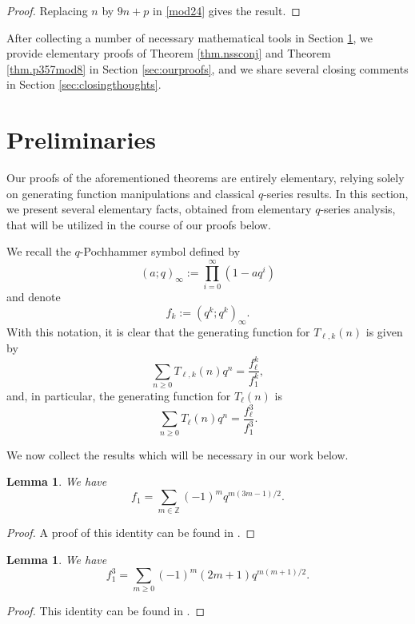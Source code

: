 \documentclass{amsart}
\newtheorem{lemma}[theorem]{Lemma}
\theoremstyle{definition}
\begin{document}
\begin{proof}
Replacing $n$ by $9n+p$ in \eqref{mod24} gives the result.
\end{proof}


After collecting a number of necessary mathematical tools in Section \ref{sec:preliminaries}, we provide elementary proofs of Theorem \ref{thm.nssconj} and Theorem \ref{thm.p357mod8} in Section \ref{sec:ourproofs}, and we share several closing comments in Section \ref{sec:closingthoughts}.

\section{Preliminaries}\label{sec:preliminaries}

Our proofs of the aforementioned theorems are entirely elementary, relying solely on generating function manipulations and classical $q$-series results. In this section, we present several elementary facts, obtained from elementary $q$-series analysis, that will be utilized in the course of our proofs below.

We recall the $q$-Pochhammer symbol defined by
\[
(a;q)_\infty := \prod_{i=0}^{\infty} (1 - aq^i)
\]
and denote
\[
f_k := (q^k;q^k)_\infty.
\]
With this notation, it is clear that the generating function for $T_{\ell,k}(n)$ is given by
\[
\sum_{n \ge 0} T_{\ell,k}(n)q^n = \frac{f_\ell^k}{f_1^k},
\]
and, in particular, the generating function for $T_\ell(n)$ is
\[
\sum_{n \ge 0} T_\ell(n)q^n = \frac{f_\ell^3}{f_1^3}.
\]

We now collect the results which will be necessary in our work below.

\begin{lemma}  We have
    \begin{equation}\label{f1}
        f_1=\sum_{m\in\mathbb{Z}}(-1)^mq^{m(3m-1)/2}.
    \end{equation}
\end{lemma}
\begin{proof}
    A proof of this identity can be found in \cite[Section 1.6]{Hirschhorn}.
\end{proof}
\begin{lemma}   We have
\begin{equation}\label{f13}
    f_1^3=\sum_{m\ge 0}(-1)^m(2m+1)q^{m(m+1)/2}.
\end{equation}
\end{lemma}
\begin{proof}
    This identity can be found in \cite[(1.7.1)]{Hirschhorn}.
\end{proof}
\end{document}
